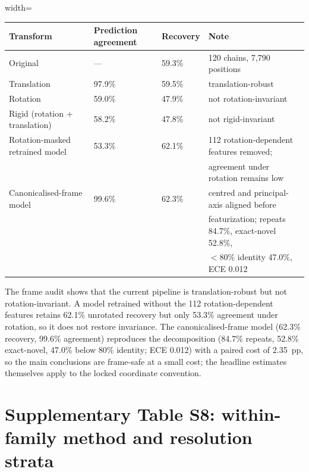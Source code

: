 \documentclass[pdflatex,sn-nature]{sn-jnl}
\begin{document}
\begingroup\footnotesize
\begin{adjustbox}{width=\textwidth}
\begin{tabular}{p{}p{}p{}p{}}
\toprule
Transform & Prediction agreement & Recovery & Note \\
\midrule
Original & --- & 59.3\% & 120 chains, 7,790 positions \\
Translation & 97.9\% & 59.5\% & translation-robust \\
Rotation & 59.0\% & 47.9\% & not rotation-invariant \\
Rigid (rotation + translation) & 58.2\% & 47.8\% & not rigid-invariant \\
Rotation-masked retrained model & 53.3\% & 62.1\% & 112 rotation-dependent features removed; \\
 & & & agreement under rotation remains low \\
Canonicalised-frame model & 99.6\% & 62.3\% & centred and principal-axis aligned before \\
 & & & featurization; repeats 84.7\%, exact-novel 52.8\%, \\
 & & & $<$80\% identity 47.0\%, ECE 0.012 \\
\bottomrule
\end{tabular}
\end{adjustbox}
\endgroup

The frame audit shows that the current pipeline is translation-robust but not rotation-invariant. A model retrained without the 112 rotation-dependent features retains 62.1\% unrotated recovery but only 53.3\% agreement under rotation, so it does not restore invariance. The canonicalised-frame model (62.3\% recovery, 99.6\% agreement) reproduces the decomposition (84.7\% repeats, 52.8\% exact-novel, 47.0\% below 80\% identity; ECE 0.012) with a paired cost of 2.35~pp, so the main conclusions are frame-safe at a small cost; the headline estimates themselves apply to the locked coordinate convention.



\section*{Supplementary Table S8: within-family method and resolution strata}
\end{document}
